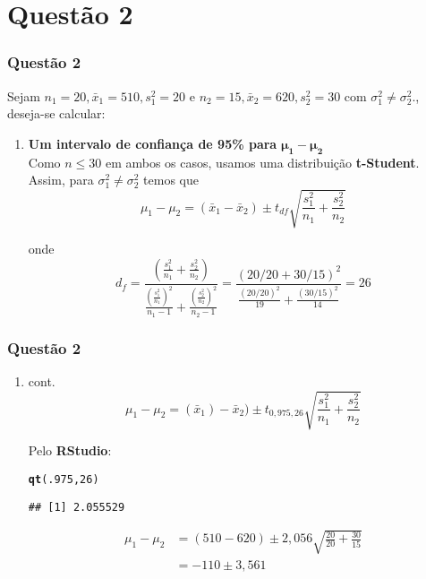 \documentclass{beamer}\usepackage[]{graphicx}\usepackage[]{color}
\makeatletter
\newcommand{\hlnum}[1]{\textcolor[rgb]{0.686,0.059,0.569}{#1}}%
\newcommand{\hlstd}[1]{\textcolor[rgb]{0.345,0.345,0.345}{#1}}%
\newcommand{\hlkwd}[1]{\textcolor[rgb]{0.737,0.353,0.396}{\textbf{#1}}}%
\newenvironment{kframe}{%
 \def\at@end@of@kframe{}%
 \ifinner\ifhmode%
  \def\at@end@of@kframe{\end{minipage}}%
  \begin{minipage}{\columnwidth}%
 \fi\fi%
 \def\FrameCommand##1{\hskip\@totalleftmargin \hskip-\fboxsep
 \colorbox{shadecolor}{##1}\hskip-\fboxsep
     \hskip-\linewidth \hskip-\@totalleftmargin \hskip\columnwidth}%
 \MakeFramed {\advance\hsize-\width
   \@totalleftmargin\z@ \linewidth\hsize
   \@setminipage}}%
 {\par\unskip\endMakeFramed%
 \at@end@of@kframe}
\newenvironment{knitrout}{}{} %
\makeatother
\begin{document}
    \section{Questão 2}
    	\begin{frame}
    		\frametitle{Questão 2}
    		Sejam $n_{1} = 20, \bar{x}_{1} = 510, s^{2}_{1} = 20$ e $n_{2} = 15, \bar{x}_{2} = 620, s^{2}_{2} = 30$ com $\sigma_{1}^{2} \neq \sigma_{2}^{2}$., deseja-se calcular:\\
    		\begin{enumerate}
    			\item \textbf{{Um intervalo de confiança de 95\% para}} $\boldsymbol{\mu_{1} - \mu_{2}}$\\
    			
    			Como $n \leq 30$ em ambos os casos, usamos uma distribuição \textbf{t-Student}.  Assim, para $\sigma_{1}^{2} \neq \sigma_{2}^{2}$ temos que $$\mu_{1}-\mu_{2} = (\bar{x}_{1} - \bar{x}_{2}) \pm t_{df}\sqrt{\frac{s_{1}^{2}}{n_{1}}+\frac{s_{2}^{2}}{n_{2}}}$$
    			
    			onde $$d_{f} = \frac{(\frac{s_{1}^{2}}{n_{1}}+\frac{s_{2}^{2}}{n_{2}})}{\frac{(\frac{s_{1}^{2}}{n_{1}})^2}{n_{1}-1} + \frac{(\frac{s_{2}^{2}}{n_{2}})^2}{n_{2}-1}} = \frac{(20/20 + 30/15)^2}{\frac{(20/20)^2}{19}+\frac{(30/15)^2}{14}} = 26$$ 
    			
    		\end{enumerate}
    	\end{frame}
    	
    	\begin{frame}[fragile]
    		\frametitle{Questão 2}
    		\begin{enumerate}
    			\item cont.$$\mu_{1} - \mu_{2} = (\bar{x}_1) - \bar{x}_2)\pm t_{0,975,26}\sqrt{\frac{s_{1}^{2}}{n_{1}}+\frac{s_{2}^{2}}{n_{2}}}$$
    			
    			Pelo \textbf{RStudio}:
\begin{knitrout}
\color{fgcolor}\begin{kframe}
\begin{alltt}
\hlkwd{qt}\hlstd{(}\hlnum{.975}\hlstd{,}\hlnum{26}\hlstd{)}
\end{alltt}
\begin{verbatim}
## [1] 2.055529
\end{verbatim}
\end{kframe}
\end{knitrout}
    		\begin{align*}
		        \mu_{1} - \mu_{2} &= (510 - 620) \pm 2,056\sqrt{\frac{20}{20} + \frac{30}{15}}\\
			&= -110 \pm 3,561
				\end{align*}
    		\end{enumerate}
    	\end{frame}
    	
\end{document}
